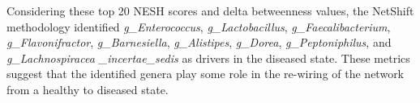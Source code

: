 Considering these top 20 \acrshort{NESH} scores and delta betweenness values, the NetShift methodology identified \textit{g\_Enterococcus}, \textit{g\_Lactobacillus}, \textit{g\_Faecalibacterium}, \textit{g\_Flavonifractor}, \textit{g\_Barnesiella}, \textit{g\_Alistipes}, \textit{g\_Dorea},
\textit{g\_Peptoniphilus}, and  \textit{g\_Lachnospiracea \_incertae\_sedis} as drivers in the diseased state. These metrics suggest that the identified genera play some role in the re-wiring of the network from a healthy to diseased state.

